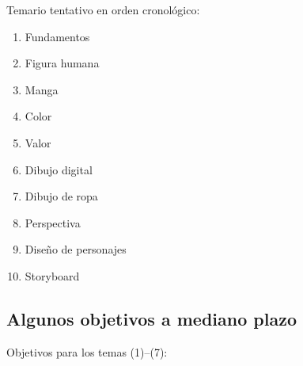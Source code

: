 
Temario tentativo en orden cronológico:

\begin{enumerate}[label=\textnormal{(\arabic*)}]
\item Fundamentos 
\item Figura humana 
\item Manga 
\item Color 
\item Valor
\item Dibujo digital 
\item Dibujo de ropa
\item Perspectiva 
\item Diseño de personajes 
\item Storyboard
\end{enumerate}

\subsection{Algunos objetivos a mediano plazo}

Objetivos para los temas (1)--(7):

